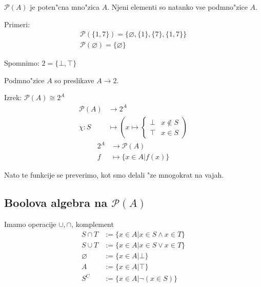 $\mathcal{P}(A)$ je poten"cna mno"zica $A$. Njeni elementi so natanko vse podmno"zice $A$.

Primeri:
\begin{gather*}
\mathcal{P}(\{1, 7\}) = \{\varnothing, \{1\}, \{7\}, \{1, 7\}\}\\
\mathcal{P}(\varnothing) = \{\varnothing\}
\end{gather*}

Spomnimo: $2 = \{\bot, \top\}$

Podmno"zice $A$ so preslikave $A \rightarrow 2$.

Izrek: $\mathcal{P}(A) \cong 2^A$
\begin{align*}
\mathcal{P}(A) &\rightarrow 2^A\\
\chi : S &\mapsto \left(x \mapsto \begin{cases}
\bot & x \notin S\\
\top & x \in S
\end{cases}\right)
\end{align*}
%
\begin{align*}
2^A &\rightarrow \mathcal{P}(A)\\
f &\mapsto \{x \in A | f(x)\}
\end{align*}

Nato te funkcije se preverimo, kot smo delali "ze mnogokrat na vajah.

\subsection{Boolova algebra na $\mathcal{P}(A)$}
Imamo operacije $\cup, \cap$, komplement
\begin{align*}
S \cap T &:= \{x \in A | x \in S \land x \in T\}\\
S \cup T &:= \{x \in A | x \in S \lor x \in T\}\\
\varnothing &:= \{x \in A | \bot\}\\
A &:= \{x \in A| \top\}\\
S^C &:= \{x \in A| \lnot (x \in S)\}
\end{align*}
